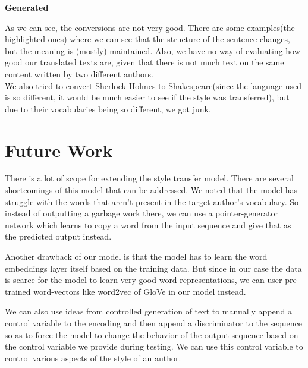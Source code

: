 \documentclass{article} %
\begin{document}
\textbf{Generated}\\

As we can see, the conversions are not very good. There are some examples(the highlighted ones) where we can see that the structure of the sentence changes, but the meaning is (mostly) maintained. Also, we have no way of evaluating how good our translated texts are, given that there is not much text on the same content written by two different authors. \\
We also tried to convert Sherlock Holmes to Shakespeare(since the language used is so different, it would be much easier to see if the style was transferred), but due to their vocabularies being so different, we got junk.

 
\section{Future Work}
There is a lot of scope for extending the style transfer model. There are several shortcomings of this model that can be addressed. We noted that the model has struggle with the words that aren't present in the target author's vocabulary. So instead of outputting a garbage work there, we can use a pointer-generator network which learns to copy a word from the input sequence and give that as the predicted output instead. \par
Another drawback of our model is that the model has to learn the word embeddings layer itself based on the training data. But since in our case the data is scarce for the model to learn very good word representations, we can user pre trained word-vectors like word2vec of GloVe in our model instead.
\par
We can also use ideas from controlled generation of text to manually append a control variable to the encoding and then append a discriminator to the sequence so as to force the model to change the behavior of the output sequence based on the control variable we provide during testing. We can use this control variable to control various aspects of the style of an author.
% 
% 



\end{document}
